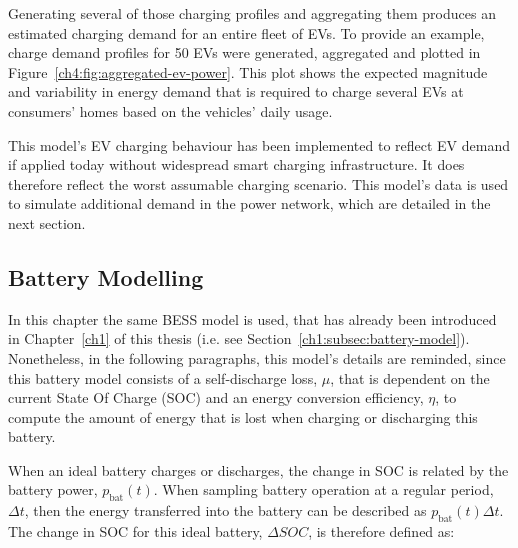 Generating several of those charging profiles and aggregating them produces an estimated charging demand for an entire fleet of EVs.
To provide an example, charge demand profiles for 50 EVs were generated, aggregated and plotted in Figure~\ref{ch4:fig:aggregated-ev-power}.
This plot shows the expected magnitude and variability in energy demand that is required to charge several EVs at consumers' homes based on the vehicles' daily usage.

This model's EV charging behaviour has been implemented to reflect EV demand if applied today without widespread smart charging infrastructure.
It does therefore reflect the worst assumable charging scenario.
This model's data is used to simulate additional demand in the power network, which are detailed in the next section.

\subsection{Battery Modelling}

In this chapter the same BESS model is used, that has already been introduced in Chapter~\ref{ch1} of this thesis (i.e. see Section~\ref{ch1:subsec:battery-model}).
Nonetheless, in the following paragraphs, this model's details are reminded, since this battery model consists of a self-discharge loss, $\mu$, that is dependent on the current State Of Charge (SOC) and an energy conversion efficiency, $\eta$, to compute the amount of energy that is lost when charging or discharging this battery. 


When an ideal battery charges or discharges, the change in SOC is related by the battery power, $p_\text{bat}(t)$.
When sampling battery operation at a regular period, $\Delta t$, then the energy transferred into the battery can be described as $p_\text{bat}(t)\Delta t$.
The change in SOC for this ideal battery, $\Delta SOC$, is therefore defined as:

